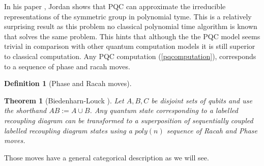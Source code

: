\documentclass{article}
\newtheorem{definition}{Definition}
\newtheorem{theorem}{Theorem}
\begin{document}
In his paper \cite{Jordan09}, Jordan shows that PQC can approximate the irreducible representations of the symmetric group in polynomial tyme. This is a relatively surprising result as this problem no classical polynomial time algorithm is known that solves the same problem. This hints that although the the PQC model seems trivial in comparison with other quantum computation models it is still superior to classical computation. Any PQC computation (\ref{pqcomputation}), corresponds to a sequence of phase and racah moves.
\begin{definition}[Phase and Racah moves]
\end{definition}
\begin{theorem}[Biedenharn-Louck \cite{Aquilanti09}] 
	Let $A,B,C$ be disjoint sets of qubits and use the shorthand $AB := A \cup B$.
	Any quantum state corresponding to a labelled recoupling diagram can be transformed to a superposition of sequentially coupled labelled recoupling diagram states using a $poly(n)$ sequence of Racah and Phase moves.
\end{theorem}
Those moves have a general categorical description as we will see.
\end{document}

